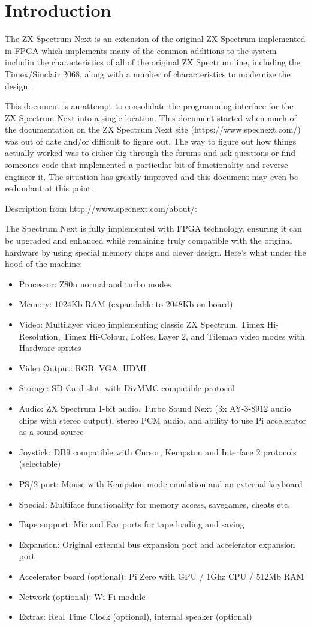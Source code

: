 \chapter{Introduction}
The ZX Spectrum Next is an extension of the original ZX Spectrum
implemented in FPGA which implements many of the common additions to
the system includin the characteristics of all of the original ZX
Spectrum line, including the Timex/Sinclair 2068, along with a number
of characteristics to modernize the design.

This document is an attempt to consolidate the programming interface
for the ZX Spectrum Next into a single location. This document started
when much of the documentation on the ZX Spectrum Next site
(https://www.specnext.com/) was out of date and/or difficult to figure
out. The way to figure out how things actually worked was to either
dig through the forums and ask questions or find someones code that
implemented a particular bit of functionality and reverse engineer
it. The situation has greatly improved and this document may even be
redundant at this point.

Description from http://www.specnext.com/about/:

The Spectrum Next is fully implemented with FPGA technology, ensuring
it can be upgraded and enhanced while remaining truly compatible with
the original hardware by using special memory chips and clever
design. Here’s what under the hood of the machine:

\begin{itemize}
\item Processor: Z80n normal and turbo modes
\item Memory: 1024Kb RAM (expandable to 2048Kb on board)
\item Video: Multilayer video implementing classic ZX Spectrum, Timex
  Hi-Resolution, Timex Hi-Colour, LoRes, Layer 2, and Tilemap video
  modes with Hardware sprites
\item Video Output: RGB, VGA, HDMI
\item Storage: SD Card slot, with DivMMC-compatible protocol
\item Audio: ZX Spectrum 1-bit audio, Turbo Sound Next (3x AY-3-8912
  audio chips with stereo output), stereo PCM audio, and ability to
  use Pi accelerator as a sound source
\item Joystick: DB9 compatible with Cursor, Kempston and Interface 2
  protocols (selectable)
\item PS/2 port: Mouse with Kempston mode emulation and an external keyboard
\item Special: Multiface functionality for memory access, savegames,
  cheats etc.
\item Tape support: Mic and Ear ports for tape loading and saving
\item Expansion: Original external bus expansion port and accelerator
  expansion port
\item Accelerator board (optional): Pi Zero with GPU / 1Ghz CPU / 512Mb RAM
\item Network (optional): Wi Fi module
\item Extras: Real Time Clock (optional), internal speaker (optional)
\end{itemize}

